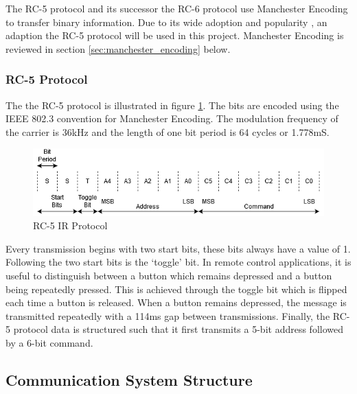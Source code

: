 The RC-5 protocol and its successor the RC-6 protocol use Manchester Encoding to transfer binary information. Due to its wide adoption and popularity \cite{rudrappa2009}, an adaption the RC-5 protocol will be used in this project. Manchester Encoding is reviewed in section \ref{sec:manchester_encoding} below.

\subsubsection{RC-5 Protocol}
\label{sec:rc_5_protocol}
The the RC-5 protocol is illustrated in figure \ref{fig:rc_5_protocol}. The bits are encoded using the IEEE 802.3 convention for Manchester Encoding. The modulation frequency of the carrier is 36kHz and the length of one bit period is 64 cycles or 1.778mS\cite{Perme2007}.

\begin{figure}[H]
	\centering
	\includegraphics[width=0.8\linewidth]{figures/litreview/rc5_protocol.png}
	\caption{RC-5 IR Protocol}
	\label{fig:rc_5_protocol}
\end{figure}

Every transmission begins with two start bits, these bits always have a value of 1. Following the two start bits is the `toggle' bit. In remote control applications, it is useful to distinguish between a button which remains depressed and a button being repeatedly pressed. This is achieved through the toggle bit which is flipped each time a button is released. When a button remains depressed, the message is transmitted repeatedly with a 114ms gap between transmissions. Finally, the RC-5 protocol data is structured such that it first transmits a 5-bit address followed by a 6-bit command.




\subsection{Communication System Structure} 


